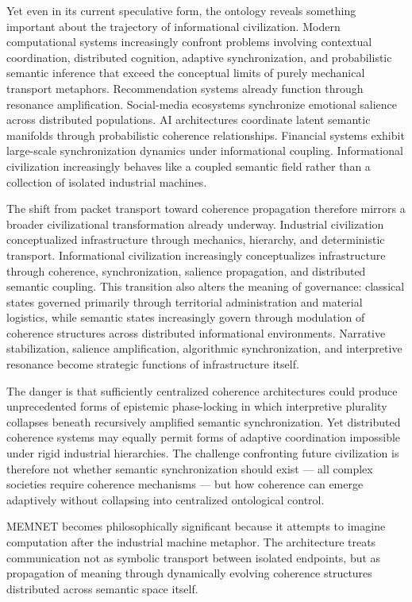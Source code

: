 \documentclass[11pt,a4paper]{article}
\begin{document}
Yet even in its current speculative form, the ontology reveals something important about the trajectory of informational civilization. Modern computational systems increasingly confront problems involving contextual coordination, distributed cognition, adaptive synchronization, and probabilistic semantic inference that exceed the conceptual limits of purely mechanical transport metaphors. Recommendation systems already function through resonance amplification. Social-media ecosystems synchronize emotional salience across distributed populations. AI architectures coordinate latent semantic manifolds through probabilistic coherence relationships. Financial systems exhibit large-scale synchronization dynamics under informational coupling. Informational civilization increasingly behaves like a coupled semantic field rather than a collection of isolated industrial machines.

The shift from packet transport toward coherence propagation therefore mirrors a broader civilizational transformation already underway. Industrial civilization conceptualized infrastructure through mechanics, hierarchy, and deterministic transport. Informational civilization increasingly conceptualizes infrastructure through coherence, synchronization, salience propagation, and distributed semantic coupling. This transition also alters the meaning of governance: classical states governed primarily through territorial administration and material logistics, while semantic states increasingly govern through modulation of coherence structures across distributed informational environments. Narrative stabilization, salience amplification, algorithmic synchronization, and interpretive resonance become strategic functions of infrastructure itself.

The danger is that sufficiently centralized coherence architectures could produce unprecedented forms of epistemic phase-locking in which interpretive plurality collapses beneath recursively amplified semantic synchronization. Yet distributed coherence systems may equally permit forms of adaptive coordination impossible under rigid industrial hierarchies. The challenge confronting future civilization is therefore not whether semantic synchronization should exist --- all complex societies require coherence mechanisms --- but how coherence can emerge adaptively without collapsing into centralized ontological control.

MEMNET becomes philosophically significant because it attempts to imagine computation after the industrial machine metaphor. The architecture treats communication not as symbolic transport between isolated endpoints, but as propagation of meaning through dynamically evolving coherence structures distributed across semantic space itself.
\end{document}
